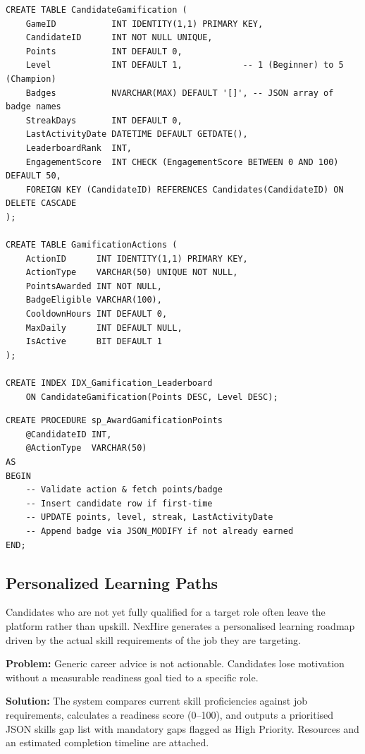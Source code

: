 \documentclass[11pt,a4paper]{article}
\begin{document}
\begin{verbatim}
CREATE TABLE CandidateGamification (
    GameID           INT IDENTITY(1,1) PRIMARY KEY,
    CandidateID      INT NOT NULL UNIQUE,
    Points           INT DEFAULT 0,
    Level            INT DEFAULT 1,            -- 1 (Beginner) to 5 (Champion)
    Badges           NVARCHAR(MAX) DEFAULT '[]', -- JSON array of badge names
    StreakDays       INT DEFAULT 0,
    LastActivityDate DATETIME DEFAULT GETDATE(),
    LeaderboardRank  INT,
    EngagementScore  INT CHECK (EngagementScore BETWEEN 0 AND 100) DEFAULT 50,
    FOREIGN KEY (CandidateID) REFERENCES Candidates(CandidateID) ON DELETE CASCADE
);

CREATE TABLE GamificationActions (
    ActionID      INT IDENTITY(1,1) PRIMARY KEY,
    ActionType    VARCHAR(50) UNIQUE NOT NULL,
    PointsAwarded INT NOT NULL,
    BadgeEligible VARCHAR(100),
    CooldownHours INT DEFAULT 0,
    MaxDaily      INT DEFAULT NULL,
    IsActive      BIT DEFAULT 1
);

CREATE INDEX IDX_Gamification_Leaderboard
    ON CandidateGamification(Points DESC, Level DESC);
\end{verbatim}

\begin{verbatim}
CREATE PROCEDURE sp_AwardGamificationPoints
    @CandidateID INT,
    @ActionType  VARCHAR(50)
AS
BEGIN
    -- Validate action & fetch points/badge
    -- Insert candidate row if first-time
    -- UPDATE points, level, streak, LastActivityDate
    -- Append badge via JSON_MODIFY if not already earned
END;
\end{verbatim}



\subsection{Personalized Learning Paths}

\noindent
Candidates who are not yet fully qualified for a target role often leave the platform rather than upskill. NexHire generates a personalised learning roadmap driven by the actual skill requirements of the job they are targeting.

\textbf{Problem:} Generic career advice is not actionable. Candidates lose motivation without a measurable readiness goal tied to a specific role.

\textbf{Solution:} The system compares current skill proficiencies against job requirements, calculates a readiness score (0--100), and outputs a prioritised JSON skills gap list with mandatory gaps flagged as High Priority. Resources and an estimated completion timeline are attached.
\end{document}
